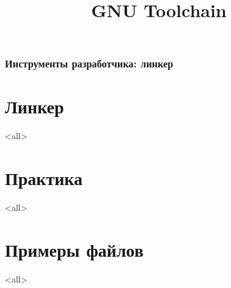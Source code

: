 
\title[toolchain]{GNU Toolchain}




\begin{frame}
	\frametitle{Инструменты разработчика: линкер}
	\titlepage
	\vspace{-0.5cm}
	\begin{center}
	\end{center}
\end{frame}

\begin{frame}
	\tableofcontents
\end{frame}



\section{Линкер}

\mode<all>{}

\section[example]{Практика}

\mode<all>{}

\section[example]{Примеры файлов}

\mode<all>{}


